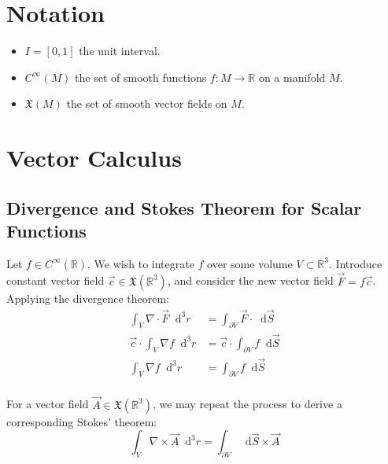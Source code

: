 \documentclass{article}
\newcommand{\diff}{\mathop{}\!\mathrm{d}}
\newcommand{\R}{\mathbb{R}}
\theoremstyle{definition}
\begin{document}
\tableofcontents

\pagebreak



\section{Notation}
\begin{itemize}
	\item $I = [0,1]$ the unit interval.
	\item $C^\infty(M)$ the set of smooth functions $f : M \to \R$ on a manifold $M$.
	\item $\mathfrak{X}(M)$ the set of smooth vector fields on $M$.
\end{itemize}


\section{Vector Calculus}
\subsection{Divergence and Stokes Theorem for Scalar Functions}
Let $f \in C^\infty(\R)$. We wish to integrate $f$ over some volume $V \subset \R^3$. 
Introduce constant vector field $\vec{c} \in \mathfrak{X}(\R^3)$, and consider
the new vector field $\vec{F} = f \vec{c}$. Applying the divergence theorem:
\begin{equation*}
\begin{split}
	\int_V \nabla \cdot \vec{F} \diff^3 r &= \int_{\partial V} \vec{F} \cdot \diff\vec{S} \\
	\vec{c} \cdot \int_V \nabla f \diff^3 r &= \vec{c} \cdot \int_{\partial V} f \diff\vec{S} \\
	\int_V \nabla f \diff^3 r &= \int_{\partial V} f \diff\vec{S} \\
\end{split}
\end{equation*}

For a vector field $\vec{A} \in \mathfrak{X}(\R^3)$, we may repeat the process to
derive a corresponding Stokes' theorem:
\begin{equation*}
	\int_V \nabla \times \vec{A} \diff^3 r = \int_{\partial V} \diff\vec{S} \times \vec{A}
\end{equation*}
\end{document}
